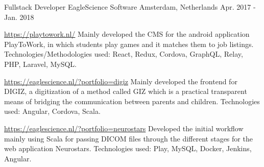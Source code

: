\begin{cventries}
\cventry
{Fullstack Developer} %
{EagleScience Software} %
{Amsterdam, Netherlands} %
{Apr. 2017 - Jan. 2018} %
{
	\begin{cvitems} %
		\item {\url{https://playtowork.nl/}}
			\newline
			Mainly developed the CMS for the android application PlayToWork, in which students play games and it matches them to job listings.
			\newline
			Technologies/Methodologies used: React, Redux, Cordova, GraphQL, Relay, PHP, Laravel, MySQL.  
		\item {\url{https://eaglescience.nl/?portfolio=digiz} 
			\newline
			Mainly developed the frontend for DIGIZ, a digitization of a method called GIZ which is a practical transparent means of bridging the communication between parents and children.
			\newline
			Technologies used: Angular, Cordova, Scala. }
		\item {\url{https://eaglescience.nl/?portfolio=neurostars}
			\newline
			Developed the initial workflow mainly using Scala for passing DICOM files through the different stages for the web application Neurostars.
			\newline
			Technologies used: Play, MySQL, Docker, Jenkins, Angular.}
	\end{cvitems}
}
\end{cventries}
